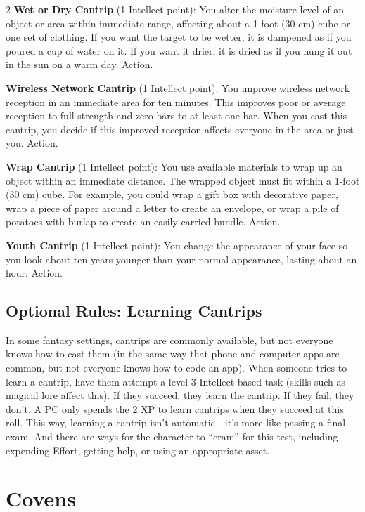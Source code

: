 \begin{multicols}{2}
\textbf{Wet or Dry Cantrip} (1 Intellect point): You alter the moisture level of an object or area within immediate range, affecting about a 1-foot (30 cm) cube or one set of clothing. If you want the target to be wetter, it is dampened as if you poured a cup of water on it. If you want it drier, it is dried as if you hung it out in the sun on a warm day. Action. 

\textbf{Wireless Network Cantrip} (1 Intellect point): You improve wireless network reception in an immediate area for ten minutes. This improves poor or average reception to full strength and zero bars to at least one bar. When you cast this cantrip, you decide if this improved reception affects everyone in the area or just you. Action. 

\textbf{Wrap Cantrip} (1 Intellect point): You use available materials to wrap up an object within an immediate distance. The wrapped object must fit within a 1-foot (30 cm) cube. For example, you could wrap a gift box with decorative paper, wrap a piece of paper around a letter to create an envelope, or wrap a pile of potatoes with burlap to create an easily carried bundle. Action. 

\textbf{Youth Cantrip} (1 Intellect point): You change the appearance of your face so you look about ten years younger than your normal appearance, lasting about an hour. Action.

\section{Optional Rules: Learning Cantrips}

In some fantasy settings, cantrips are commonly available, but not everyone knows how to cast them (in the same way that phone and computer apps are common, but not everyone knows how to code an app). When someone tries to learn a cantrip, have them attempt a level 3 Intellect-based task (skills such as magical lore affect this). If they succeed, they learn the cantrip. If they fail, they don’t. A PC only spends the 2 XP to learn cantrips when they succeed at this roll.  This way, learning a cantrip isn’t automatic—it’s more like passing a final exam. And there are ways for the character to “cram” for this test, including expending Effort, getting help, or using an appropriate asset.

\chapter{Covens}


\end{multicols}
